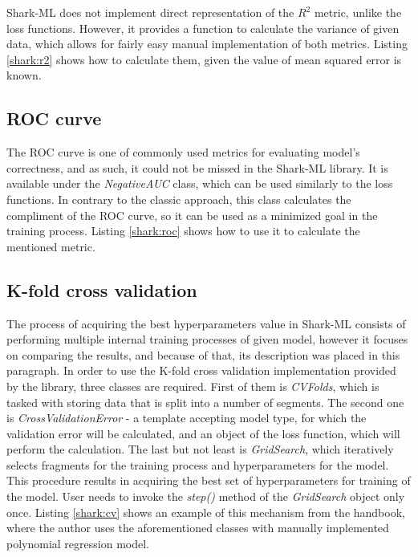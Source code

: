 Shark-ML does not implement direct representation of the $R^2$ metric, unlike the loss functions. However, it provides a function to calculate the variance of given data, which allows for fairly easy manual implementation of both metrics. Listing \ref{shark:r2} shows how to calculate them, given the value of mean squared error is known.


\subsection{ROC curve}

The ROC curve is one of commonly used metrics for evaluating model's correctness, and as such, it could not be missed in the Shark-ML library. It is available under the \textit{NegativeAUC} class, which can be used similarly to the loss functions. In contrary to the classic approach, this class calculates the compliment of the ROC curve, so it can be used as a minimized goal in the training process. Listing \ref{shark:roc} shows how to use it to calculate the mentioned metric.


\subsection{K-fold cross validation}

The process of acquiring the best hyperparameters value in Shark-ML consists of performing multiple internal training processes of given model, however it focuses on comparing the results, and because of that, its description was placed in this paragraph. In order to use the K-fold cross validation implementation provided by the library, three classes are required. First of them is \textit{CVFolds}, which is tasked with storing data that is split into a number of segments. The second one is \textit{CrossValidationError} - a template accepting model type, for which the validation error will be calculated, and an object of the loss function, which will perform the calculation. The last but not least is \textit{GridSearch}, which iteratively selects fragments for the training process and hyperparameters for the model. This procedure results in acquiring the best set of hyperparameters for training of the model. User needs to invoke the \textit{step()} method of the \textit{GridSearch} object only once. Listing \ref{shark:cv} shows an example of this mechanism from the handbook\cite{handsOnMachineLearning}, where the author uses the aforementioned classes with manually implemented polynomial regression model.  

